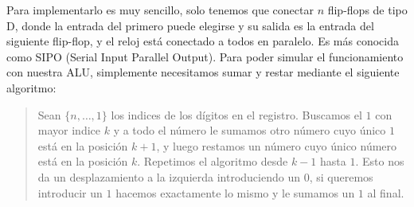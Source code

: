 \documentclass[answers]{exam}
\begin{document}
\begin{questions}
  \begin{solution}
    Para implementarlo es muy sencillo, solo tenemos que conectar $n$ flip-flops
    de tipo D, donde la entrada del primero puede elegirse y su salida es la
    entrada del siguiente flip-flop, y el reloj está conectado a todos en
    paralelo. Es más conocida como SIPO (Serial Input Parallel Output). Para
    poder simular el funcionamiento con nuestra ALU, simplemente necesitamos
    sumar y restar mediante el siguiente algoritmo:

    \begin{quote}
      Sean $\{n,\ldots,1\}$ los indices de los dígitos en el registro. Buscamos el
      $1$ con mayor indice $k$ y a todo el número le sumamos otro número cuyo
      único $1$ está en la posición $k + 1$, y luego restamos un número cuyo
      único número está en la posición $k$. Repetimos el algoritmo desde $k - 1$
      hasta $1$. Esto nos da un desplazamiento a la izquierda introduciendo un
      $0$, si queremos introducir un $1$ hacemos exactamente lo mismo y le
      sumamos un $1$ al final.
    \end{quote}
  \end{solution}


\end{questions}
\end{document}
